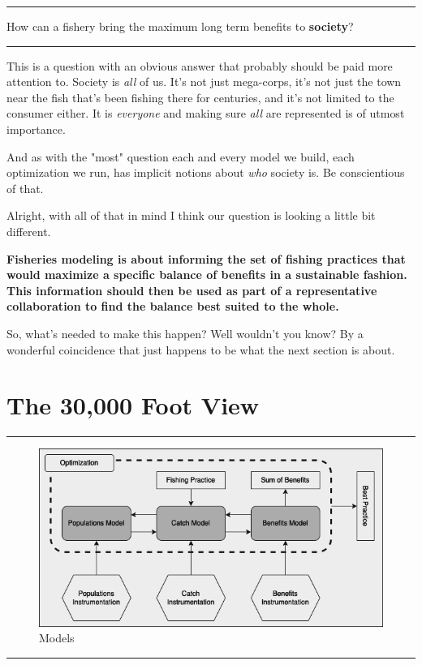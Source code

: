 \documentclass[11pt,a5paper]{book}
\begin{document}
\noindent \rule{\textwidth}{0.5pt} 
\noindent  How can a fishery bring the maximum long term benefits to \textbf{society}?
\newline
\rule{\textwidth}{0.5pt} 
\vspace{5pt}

This is a question with an obvious answer that probably should be paid more attention to. Society is \textit{all} of us. It's not just mega-corps, it's not just the town near the fish that's been fishing there for centuries, and it's not limited to the consumer either. It is \textit{everyone} and making sure \textit{all} are represented is of utmost importance. 
\newline

And as with the "most" question each and every model we build, each optimization we run, has implicit notions about \textit{who} society is. Be conscientious of that. 
\newpage

Alright, with all of that in mind I think our question is looking a little bit different. 
\newline

 \hangindent=1cm \noindent \textbf{Fisheries modeling is about informing the set of fishing practices that would maximize a specific balance of benefits in a sustainable fashion. This information should then be used as part of a representative collaboration to find the balance best suited to the whole.}
\newline

So, what's needed to make this happen? Well wouldn't you know? By a wonderful coincidence that just happens to be what the next section is about. 
\newpage

\chapter{The 30,000 Foot View}

\noindent \rule{\textwidth}{0.5pt} 
\begin{figure}[h!] 
  \includegraphics[width=\linewidth]{drawings/high_level_models.png}
  \caption{Models}
  \label{fig:high_level_models}
\end{figure}
\newline
\rule{\textwidth}{0.5pt} 
\vspace{5pt}
\end{document}
